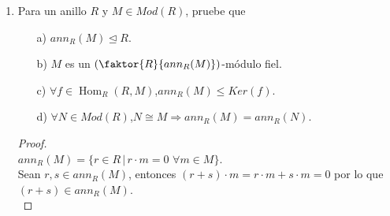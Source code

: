 \documentclass{article}
\begin{document}
\begin{enumerate}[label=\textbf{Ej \arabic*.}]
\begin{proof}
		$\boxed{\Leftarrow )}$ Sean $Q,Q' \in Mod\lrprth{R}$. Suponga que $soc\lrprth{Q} \cong soc\lrprth{Q'}$. Como $R$ es artiniano a izquierda, $soc\lrprth{Q} \hookrightarrow Q$ y $soc\lrprth{Q'} \hookrightarrow Q'$ son mono-esencial. Dado que $Q$ y $Q'$ son inyectivos, $soc\lrprth{Q} \hookrightarrow Q$ y $soc\lrprth{Q'} \hookrightarrow Q'$ son envolventes inyectivas. Ahora, puesto que $soc\lrprth{Q} \cong soc\lrprth{Q'}$, $soc\lrprth{Q} \hookrightarrow Q$ y $soc\lrprth{Q} \hookrightarrow Q'$ son envolventes inyectivas de $Q$. Usando el \textbf{Ejercicio 88.}, $Q$ y $Q'$ son inyectivos.\\
		$\therefore Q\cong Q'$
		
		$\boxed{c)}$ Como $S_{i}$ es simple, por la \textbf{Proposición 3.3.9.a)}, $I_{0}\lrprth{S_{i}}$ es inyectivo inescindible.\\
		
		Por otro lado, considere $S_{i}$, $S_{j}$ dos $R$-módulos simples no isomorfos. Entonces, por la \textbf{Proposición 3.3.9.b)}, $soc\lrprth{I_{0}\lrprth{S_{i}}} \cong S_{i}$ y $soc\lrprth{I_{0}\lrprth{S_{j}}} \cong S_{j}$. Luego, por el inciso anterior, $I_{0}\lrprth{S_{i}} \not\cong I_{0}\lrprth{S_{j}}$.\\
		
		Por último, suponga que $Q$ es inyectivo inescindible. Por la \textbf{Proposición 3.3.9.b)}, $soc\lrprth{Q} \cong S_{i}$, para algún $i \in [1,n]$. Por el inciso anterior, $Q \cong I_{0}\lrprth{S_{i}}$.\\
		$\therefore\lrbrack{I_{0}\lrprth{S_{j}}}_{j=1}^{n}$ es una familia completa de inyectivos inescindibles en $Mod\lrprth{R}$ no isomorfos dos a dos.
	\end{proof}
	
	\item Para un anillo $R$ y $M\in Mod(R)$, pruebe que 
	\begin{itemize}
		\item[a)] $ann_R(M)\unlhd R$.
		\item[b)] $M$ es un $\left(\faktor{R}{ann_R(M)}\right)$-módulo fiel.
		\item[c)] $\forall f\in \operatorname{Hom}_R(R,M)$,\quad $ann_R(M)\leq Ker(f)$.
		\item[d)] $\forall N\in Mod(R)$,\quad $N\cong M\Longrightarrow ann_R(M)=ann_R(N)$.
	\end{itemize}
	\begin{proof}
		\\
		$ann_R(M)=\{r\in R\,|\,r\cdot m=0\,\,\forall m\in M\}$.\\
		Sean $r,s\in ann_R(M)$, entonces $(r+s)\cdot m=r\cdot m+s\cdot m=0$ por lo que $(r+s)\in ann_R(M)$.\\
		

\end{proof}
\end{enumerate}
\end{document}
